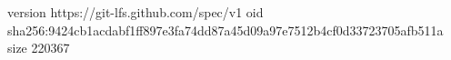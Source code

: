 version https://git-lfs.github.com/spec/v1
oid sha256:9424cb1acdabf1ff897e3fa74dd87a45d09a97e7512b4cf0d33723705afb511a
size 220367
